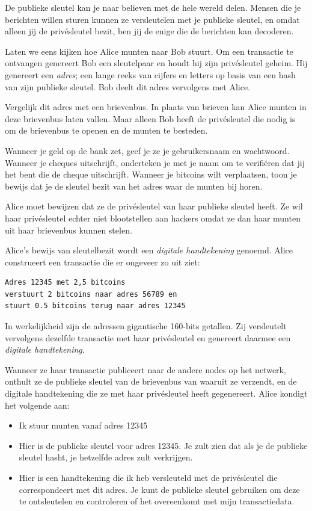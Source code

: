\documentclass[
  letterpaper,
]{scrbook}
\begin{document}
De publieke sleutel kan je naar believen met de hele wereld delen.
Mensen die je berichten willen sturen kunnen ze versleutelen met je
publieke sleutel, en omdat alleen jij de privésleutel bezit, ben jij de
enige die de berichten kan decoderen.

Laten we eens kijken hoe Alice munten naar Bob stuurt. Om een transactie
te ontvangen genereert Bob een sleutelpaar en houdt hij zijn
privésleutel geheim. Hij genereert een \emph{adres}; een lange reeks van
cijfers en letters op basis van een hash van zijn publieke sleutel. Bob
deelt dit adres vervolgens met Alice.

Vergelijk dit adres met een brievenbus. In plaats van brieven kan Alice
munten in deze brievenbus laten vallen. Maar alleen Bob heeft de
privésleutel die nodig is om de brievenbus te openen en de munten te
besteden.

Wanneer je geld op de bank zet, geef je ze je gebruikersnaam en
wachtwoord. Wanneer je cheques uitschrijft, onderteken je met je naam om
te verifiëren dat jij het bent die de cheque uitschrijft. Wanneer je
bitcoins wilt verplaatsen, toon je bewijs dat je de sleutel bezit van
het adres waar de munten bij horen.

Alice moet bewijzen dat ze de privésleutel van haar publieke sleutel
heeft. Ze wil haar privésleutel echter niet blootstellen aan hackers
omdat ze dan haar munten uit haar brievenbus kunnen stelen.

Alice's bewijs van sleutelbezit wordt een \emph{digitale handtekening}
genoemd. Alice construeert een transactie die er ongeveer zo uit ziet:

\begin{verbatim}
Adres 12345 met 2,5 bitcoins 
verstuurt 2 bitcoins naar adres 56789 en 
stuurt 0.5 bitcoins terug naar adres 12345
\end{verbatim}

In werkelijkheid zijn de adressen gigantische 160-bits getallen. Zij
versleutelt vervolgens dezelfde transactie met haar privésleutel en
genereert daarmee een \emph{digitale handtekening}.

Wanneer ze haar transactie publiceert naar de andere nodes op het
netwerk, onthult ze de publieke sleutel van de brievenbus van waaruit ze
verzendt, en de digitale handtekening die ze met haar privésleutel heeft
gegenereert. Alice kondigt het volgende aan:

\begin{itemize}
\item
  Ik stuur munten vanaf adres 12345
\item
  Hier is de publieke sleutel voor adres 12345. Je zult zien dat als je
  de publieke sleutel hasht, je hetzelfde adres zult verkrijgen.
\item
  Hier is een handtekening die ik heb versleuteld met de privésleutel
  die correspondeert met dit adres. Je kunt de publieke sleutel
  gebruiken om deze te ontsleutelen en controleren of het overeenkomt
  met mijn transactiedata.
\end{itemize}
\end{document}
